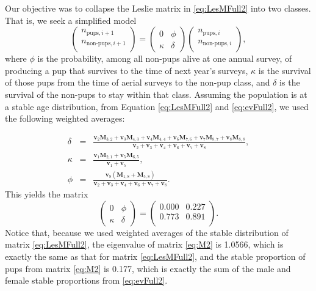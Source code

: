 \documentclass[12pt, titlepage]{article}\usepackage[]{graphicx}\usepackage[]{color}
\def\bv{\mathbf{v}}
\def\bM{\mathbf{M}}
\begin{document}
Our objective was to collapse the Leslie matrix in \ref{eq:LesMFull2} into two classes. That is, we seek a simplified model
\[
  \left(\begin{array}{c}
    n_{\textrm{pups},i+1} \\
    n_{\textrm{non-pups},i+1} \\
  \end{array}\right) =
    \left( \begin{array}{ll}
      0 & \phi \\
      \kappa & \delta
  \end{array} \right)
    \left(\begin{array}{c}
    n_{\textrm{pups},i} \\
    n_{\textrm{non-pups},i} \\
  \end{array}\right),
\]
where $\phi$ is the probability, among all non-pups alive at one annual survey, of producing a pup that survives to the time of next year's surveys, $\kappa$ is the survival of those pups from the time of aerial surveys to the non-pup class, and $\delta$
is the survival of the non-pups to stay within that class. Assuming the population is at a stable age distribution, from Equation \ref{eq:LesMFull2} and \ref{eq:evFull2}, we used the following weighted averages:

\begin{equation} \label{eq:delphikap}
\begin{array}{rcl}
  \delta & = & \frac{ \bv_2\bM_{3,2}+\bv_3\bM_{4,3}+\bv_4\bM_{4,4}+\bv_6\bM_{7,6}+\bv_7\bM_{8,7}+\bv_8\bM_{8,8} }
  {\bv_2 + \bv_3 + \bv_4 + \bv_6 + \bv_7 + \bv_8}, \\
  \kappa & = & \frac{ \bv_1\bM_{2,1} + \bv_5\bM_{6,5} } { \bv_1 + \bv_5 }, \\
  \phi & = & \frac{\bv_8(\bM_{1,8} + \bM_{5,8})}{\bv_2 + \bv_3 + \bv_4 + \bv_6 + \bv_7 + \bv_8}.
\end{array}
\end{equation}
This yields the matrix
\begin{equation}\label{eq:M2}
  \left( \begin{array}{ll}
      0 & \phi \\
      \kappa & \delta
  \end{array} \right) = 
  \left( \begin{array}{ll}
 0.000 & 0.227 \\ 
  0.773 & 0.891 \\ 
  
  \end{array} \right).
\end{equation}
Notice that, because we used weighted averages of the stable distribution of matrix \ref{eq:LesMFull2}, the eigenvalue of matrix \ref{eq:M2} is 1.0566, which is exactly the same as that for matrix \ref{eq:LesMFull2}, and the stable proportion of pups from matrix \ref{eq:M2} is 0.177, which is exactly the sum of the male and female stable proportions from \ref{eq:evFull2}.
\end{document}
